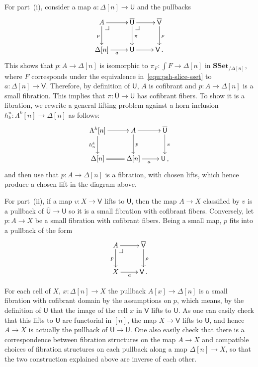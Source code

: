 \documentclass[reqno,10pt,a4paper,oneside]{amsart}
\makeatletter
\renewenvironment{proof}[1][\proofname] {\par\pushQED{\qed}\normalfont\topsep6\p@\@plus6\p@\relax\trivlist\item[\hskip\labelsep\bf#1\@addpunct{.}]\ignorespaces}{\popQED\endtrivlist\@endpefalse}
\numberwithin{equation}{section}
\theoremstyle{mythm}
\theoremstyle{mydef}
\theoremstyle{myrmk}
\newcommand{\pullback}[1]{\save*!/#1-1.2pc/#1:(-1,1)@^{|-}\restore}
\newcommand{\drpullback}{\pullback{dr}}
\newcommand{\co}{\colon}
\newcommand{\SSet}{\mathbf{SSet}}
\newcommand{\UU}{\overline{\mathsf{U}}}
\newcommand{\U}{\mathsf{U}}
\newcommand{\VV}{\overline{\mathsf{V}}}
\newcommand{\V}{\mathsf{V}}
\makeatother
\begin{document}
\begin{proof}
For part~(i), consider a map $a \co \Delta[n] \rightarrow \U$ and the pullbacks
\[
\xymatrix{
A \ar[r] \ar[d]_p  \drpullback & \UU \ar[d]^{\pi} \ar[r]  \drpullback & \VV \ar[d]^{\rho} \\
\Delta[n] \ar[r]_{a} & \U \ar[r] & \V \, . }
\]
This shows that $p \co A \rightarrow \Delta[n]$ is isomorphic to $\pi_F \co \int F \rightarrow \Delta[n]$ in $\SSet_{/ \Delta[n]}$, where $F$ corresponds under the equivalence in~\eqref{equ:psh-slice-sset} to 
$a \co \Delta[n] \rightarrow \V$. Therefore, by definition of $\U$, $A$ is cofibrant and $p \co A \rightarrow \Delta[n]$ is a small fibration. This implies that $\pi \co \UU \rightarrow \U$ has cofibrant fibers. To show it is a fibration, we rewrite a general lifting problem against a horn inclusion $h^n_k \co \Lambda^k[n] \rightarrow \Delta[n]$ as follows:
\[
\xymatrix{
\Lambda^k[n] \ar[r] \ar[d]_{h^k_n} & A  \ar[d]^{p} \ar[r] & \UU \ar[d]^\pi \\
\Delta[n] \ar@{=}[r]  & \Delta[n] \ar[r]_a & \U \, ,  }
\]
and then use that $p \co A  \to \Delta[n]$ is a fibration, with chosen lifts, which hence produce a chosen lift in the diagram above.

For part~(ii), if a map $v \co X \to \V$ lifts to $\U$, then the map $A \to X$ classified by $v$ is a pullback of $\UU \to \U$ so it is a small fibration with cofibrant fibers. Conversely, let $p \co A \to X$ be a small fibration with cofibrant fibers. Being a small 
map, $p$ fits into a pullback of the form 
\[
\xymatrix{
A \ar[r] \ar[d]_p \drpullback  &  \VV \ar[d]^{\rho} \\
X \ar[r]_{a} & \V \, . }
\]

For each cell of $X$,  $x \co \Delta[n] \rightarrow X$ the pullback $A[x] \rightarrow \Delta[n]$ is a small fibration with cofibrant domain by the assumptions on $p$, which means, by the definition of $\U$ that the image of the cell $x$ in $\V$ lifts to $\U$. As one can easily check that this lifts to $\U$ are functorial in $[n]$, the map $X \rightarrow \V$ lifts to $\U$, and hence $A \rightarrow X$ is actually the pullback of $\UU \rightarrow \U$. One also easily check that there is a correspondence between fibration structures on the map $A \to X$ and compatible choices of fibration structures on each pullback along a map $\Delta[n] \to X$, so that the two construction explained above are inverse of each other.



\end{proof}
\end{document}
